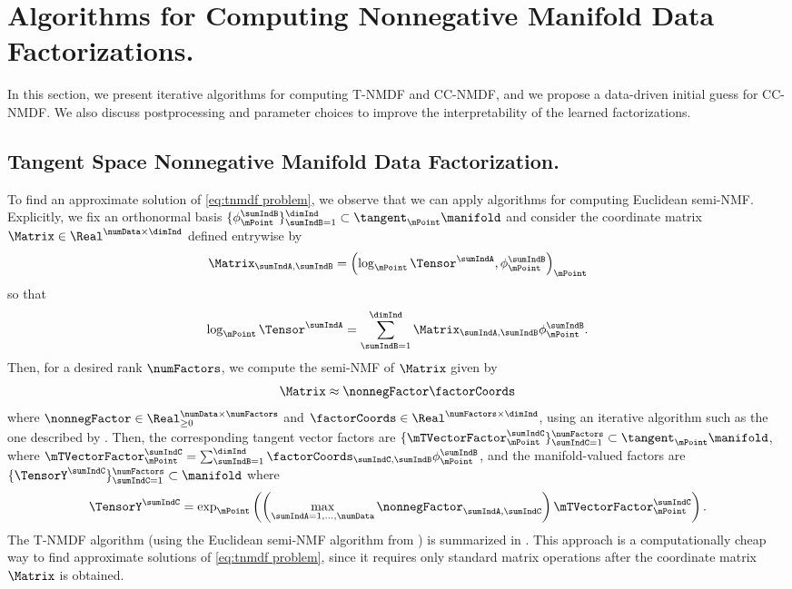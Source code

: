 \section{Algorithms for Computing Nonnegative Manifold Data Factorizations.}
\label{sec:algorithms}
In this section, we present iterative algorithms for computing T-NMDF and CC-NMDF, and we propose a data-driven initial guess for CC-NMDF. We also discuss postprocessing and parameter choices to improve the interpretability of the learned factorizations.
\subsection{Tangent Space Nonnegative Manifold Data Factorization.}
To find an approximate solution of \cref{eq:tnmdf problem}, we observe that we can apply algorithms for computing Euclidean semi-NMF. Explicitly, we fix an orthonormal basis $\{\phi_\mPoint^\sumIndB\}_{\sumIndB=1}^\dimInd \subset \tangent_\mPoint \manifold$ and consider the coordinate matrix $\Matrix \in \Real^{\numData \times \dimInd}$ defined entrywise by
\begin{equation}
    \Matrix_{\sumIndA, \sumIndB} = \left ( \log_\mPoint \Tensor^\sumIndA, \phi_\mPoint^\sumIndB \right )_\mPoint
\end{equation}
so that
\begin{equation}
\label{eq:coord matrix}
    \log_{\mPoint} \Tensor^\sumIndA = \sum_{\sumIndB=1}^\dimInd \Matrix_{\sumIndA,\sumIndB} \phi_\mPoint^\sumIndB.
\end{equation}
Then, for a desired rank $\numFactors$, we compute the semi-NMF of $\Matrix$ given by
\begin{equation}
    \Matrix \approx \nonnegFactor \factorCoords
\end{equation}
where $\nonnegFactor \in \Real_{\geq 0}^{\numData \times \numFactors}$ and $\factorCoords\in\Real^{\numFactors \times \dimInd}$, using an iterative algorithm such as the one described by \cite{ding2008convex}. Then, the corresponding tangent vector factors are 
$\{\mTVectorFactor_\mPoint^\sumIndC\}_{\sumIndC=1}^\numFactors \subset \tangent_\mPoint\manifold$, where $\mTVectorFactor_\mPoint^\sumIndC = \sum_{\sumIndB=1}^\dimInd \factorCoords_{\sumIndC, \sumIndB}\phi_{\mPoint}^\sumIndB$, and the manifold-valued factors are $\{\TensorY^\sumIndC\}_{\sumIndC=1}^\numFactors \subset \manifold$ where
\begin{equation}
    \TensorY^\sumIndC = \exp_\mPoint \left ( \left(\max_{\sumIndA = 1, \dots, \numData} \nonnegFactor_{\sumIndA, \sumIndC}\right) \mTVectorFactor_\mPoint^\sumIndC \right ).
\end{equation}
The T-NMDF algorithm (using the Euclidean semi-NMF algorithm from \citealp{ding2008convex}) is summarized in . This approach is a computationally cheap way to find approximate solutions of \eqref{eq:tnmdf problem}, since it requires only standard matrix operations after the coordinate matrix $\Matrix$ is obtained. 

